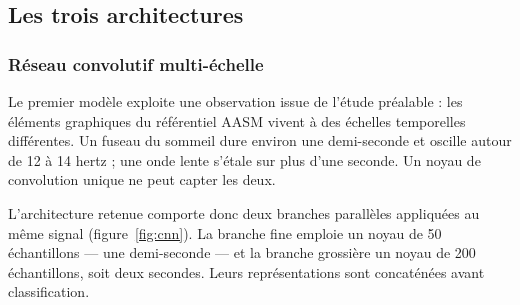 \subsection{Les trois architectures}

\subsubsection{Réseau convolutif multi-échelle}

Le premier modèle exploite une observation issue de l'étude préalable : les éléments
graphiques du référentiel AASM vivent à des échelles temporelles différentes. Un fuseau
du sommeil dure environ une demi-seconde et oscille autour de 12 à 14 hertz ; une onde
lente s'étale sur plus d'une seconde. Un noyau de convolution unique ne peut capter les
deux.

L'architecture retenue comporte donc deux branches parallèles appliquées au même signal
(figure~\ref{fig:cnn}). La branche fine emploie un noyau de 50 échantillons --- une
demi-seconde --- et la branche grossière un noyau de 200 échantillons, soit deux
secondes. Leurs représentations sont concaténées avant classification.

